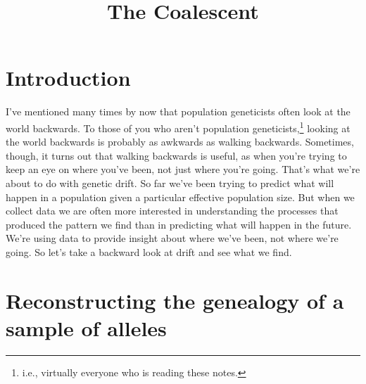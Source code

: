 \documentclass[12pt]{article}
\title{The Coalescent}
\begin{document}
\maketitle

\thispagestyle{first}

\section*{Introduction}

I've mentioned many times by now that population geneticists often
look at the world backwards. To those of you who aren't population
geneticists,\footnote{i.e., virtually everyone who is reading these
  notes.} looking at the world backwards is probably as awkwards as
walking backwards. Sometimes, though, it turns out that walking
backwards is useful, as when you're trying to keep an eye on where
you've been, not just where you're going. That's what we're about to
do with genetic drift. So far we've been trying to predict what will
happen in a population given a particular effective population
size. But when we collect data we are often more interested in
understanding the processes that produced the pattern we find than in
predicting what will happen in the future. We're using data to provide
insight about where we've been, not where we're going. So let's take a
backward look at drift and see what we find.


\section*{Reconstructing the genealogy of a sample of
  alleles}
\end{document}
